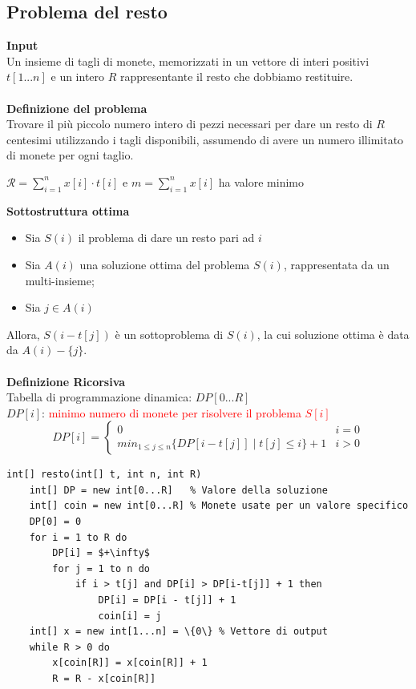 \documentclass[../cheatSheetAlgoritmi.tex]{subfiles}
\begin{document}
\subsection{Problema del resto}
\textbf{Input}\\
Un insieme di tagli di monete, memorizzati in un vettore di interi positivi $t[1...n]$ e un intero $R$ rappresentante il resto che dobbiamo restituire.\\\\
\textbf{Definizione del problema}\\
Trovare il più piccolo numero intero di pezzi necessari per dare un resto di $R$ centesimi utilizzando i tagli disponibili, assumendo di avere un numero illimitato di monete per ogni taglio.
\begin{center}
	$\mathcal{R} = \sum_{i=1}^{n} x[i] \cdot t[i]$ e $m = \sum_{i = 1}^{n} x[i]$ ha valore minimo
\end{center}
\textbf{Sottostruttura ottima}
\begin{itemize}
	\item Sia $S(i)$ il problema di dare un resto pari ad $i$
	\item Sia $A(i)$ una soluzione ottima del problema $S(i)$, rappresentata da un multi-insieme; 
	\item Sia $j \in A(i)$
\end{itemize}
Allora, $S(i - t[j])$ è un sottoproblema di $S(i)$, la cui soluzione ottima è data da $A(i) - \{j\}$.\\\\
\textbf{Definizione Ricorsiva}\\
Tabella di programmazione dinamica: $DP[0...R]$\\
$DP[i]$: \textcolor{red}{minimo numero di monete per risolvere il problema $S[i]$}\\
\begin{equation*}
  	DP[i]=\begin{cases}
   		0  & \text{$i = 0$}\\
   		min_{1 \leq j \leq n}\{DP[i - t[j]] \mid t[j] \leq i\} + 1 & \text{$i > 0$}
  	\end{cases}
\end{equation*}
\begin{lstlisting}[caption=Resto (DP)]
int[] resto(int[] t, int n, int R)
	int[] DP = new int[0...R] 	% Valore della soluzione
	int[] coin = new int[0...R]	% Monete usate per un valore specifico
	DP[0] = 0
	for i = 1 to R do
		DP[i] = $+\infty$
		for j = 1 to n do
			if i > t[j] and DP[i] > DP[i-t[j]] + 1 then
				DP[i] = DP[i - t[j]] + 1
				coin[i] = j
	int[] x = new int[1...n] = \{0\} % Vettore di output
	while R > 0 do
		x[coin[R]] = x[coin[R]] + 1
		R = R - x[coin[R]]
\end{lstlisting}
\end{document}
